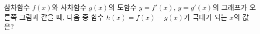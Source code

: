 \noindent\begin{minipage}[t]{0.58\linewidth}\vspace{0pt}\raggedright 삼차함수 $f(x)$와 사차함수 $g(x)$의 도함수 $y=f'(x)$, $y=g'(x)$의 그래프가 오른쪽 그림과 같을 때, 다음 중 함수 $h(x)=f(x)-g(x)$가 극대가 되는 $x$의 값은?\end{minipage}\hfill\begin{minipage}[t]{0.4\linewidth}\vspace{0pt}\centering \resizebox{\ifdim\width>\linewidth\linewidth\else\width\fi}{!}{}\end{minipage}\par
{}
